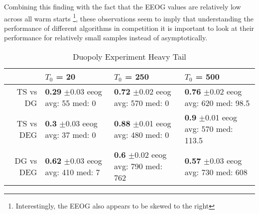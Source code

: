 \documentclass[../competing_bandits.tex]{subfiles}
\begin{document}

Combining this finding with the fact that the EEOG values are relatively low across all warm starts \footnote{Interestingly, the EEOG also appears to be skewed to the right}, these observations seem to imply that understanding the performance of different algorithms in competition it is important to look at their performance for relatively small samples instead of asymptotically.

\begin{table}[ht]
\centering
\caption{Duopoly Experiment Heavy Tail} 
\begin{tabular}{rlll}
  \hline
 & $T_0$ = 20 & $T_0$ = 250 & $T_0$ = 500 \\ 
  \hline
TS vs DG & \makecell{\textbf{0.29} $\pm$0.03\\ eeog \\ avg: 55\\ med: 0} & \makecell{\textbf{0.72} $\pm$0.02\\ eeog \\ avg: 570\\ med: 0} & \makecell{\textbf{0.76} $\pm$0.02\\ eeog \\ avg: 620\\ med: 98.5} \\ 
  TS vs DEG & \makecell{\textbf{0.3} $\pm$0.03\\ eeog \\ avg: 37\\ med: 0} & \makecell{\textbf{0.88} $\pm$0.01\\ eeog \\ avg: 480\\ med: 0} & \makecell{\textbf{0.9} $\pm$0.01\\ eeog \\ avg: 570\\ med: 113.5} \\ 
  DG vs DEG & \makecell{\textbf{0.62} $\pm$0.03\\ eeog \\ avg: 410\\ med: 7} & \makecell{\textbf{0.6} $\pm$0.02\\ eeog \\ avg: 790\\ med: 762} & \makecell{\textbf{0.57} $\pm$0.03\\ eeog \\ avg: 730\\ med: 608} \\ 
   \hline
\end{tabular}
\label{sim_ht}
\end{table}
\end{document}

